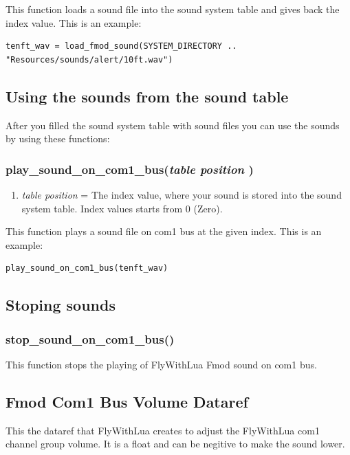 \documentclass[11pt,parskip=half,a4paper]{scrartcl}
\begin{document}
This function loads a sound file into the sound system table and gives back the index value. This is an example:

\begin{lstlisting}
tenft_wav = load_fmod_sound(SYSTEM_DIRECTORY .. "Resources/sounds/alert/10ft.wav")
\end{lstlisting}


\newpage
\subsection{Using the sounds from the sound table}

After you filled the sound system table with sound files you can use the sounds by using these functions:


\subsubsection{ play\_sound\_on\_com1\_bus(\emph{table position} )}

\begin{enumerate}
	\item \emph{table position} = The index value, where your sound is stored into the sound system table. Index values starts from 0 (Zero).
\end{enumerate}

This function plays a sound file on com1 bus at the given index. This is an example:


\begin{lstlisting}
play_sound_on_com1_bus(tenft_wav)
\end{lstlisting}

\subsection{Stoping sounds}
\subsubsection{ stop\_sound\_on\_com1\_bus()}
This function stops the playing of FlyWithLua Fmod sound on com1 bus.

\subsection{Fmod Com1 Bus Volume Dataref}
This the dataref that FlyWithLua creates to adjust the FlyWithLua com1 channel group volume. It is a float and can be negitive to make the sound lower.
\end{document}
